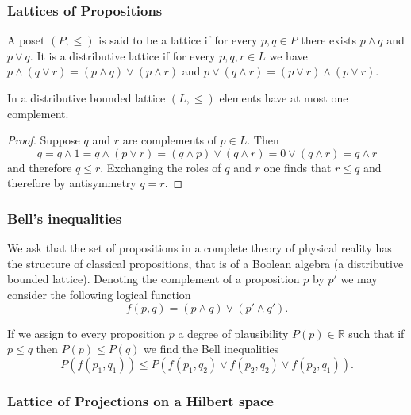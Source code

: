 \documentclass{beamer}
\theoremstyle{definition}
\begin{document}
\begin{frame}

\frametitle{Lattices of Propositions}

\begin{definition}
A poset $(P,\leq)$ is said to be a lattice if for every $p,q\in P$ there exists $p\wedge q$ and $p\vee q$. It is a distributive lattice if for every $p,q,r\in L$ we have $p\wedge (q\vee r)=(p\wedge q)\vee (p\wedge r)$ and $p\vee (q\wedge r)=(p\vee r)\wedge (p\vee r)$.
\end{definition}

\begin{theorem}
In a distributive bounded lattice $(L,\leq)$ elements have at most one complement.
\end{theorem}

\begin{proof}
Suppose $q$ and $r$ are complements of $p\in L$. Then
\begin{equation}
q = q\wedge 1 = q\wedge (p\vee r) =(q\wedge p)\vee(q\wedge r) = 0\vee(q\wedge r)=q\wedge r 
\end{equation}
and therefore $q\leq r$. Exchanging the roles of $q$ and $r$ one finds that $r\leq q$ and therefore by antisymmetry $q=r$.
\end{proof}

\end{frame}

\begin{frame}

\frametitle{Bell's inequalities}

We ask that the set of propositions in a complete theory of physical reality has the structure of classical propositions, that is of a Boolean algebra (a distributive bounded lattice). Denoting the complement of a proposition $p$ by $p'$ we may consider the following logical function
\begin{equation}
f(p,q)=(p\wedge q)\vee (p' \wedge q').
\end{equation}

If we assign to every proposition $p$ a degree of plausibility $P(p)\in\mathbb{R}$ such that if $p\leq q$ then $P(p)\leq P(q)$ we find the Bell inequalities
\begin{equation}
P(f(p_1,q_1))\leq P(f(p_1,q_2)\vee f(p_2,q_2)\vee f(p_2,q_1)).
\end{equation}

\end{frame}

\begin{frame}

\frametitle{Lattice of Projections on a Hilbert space}

\end{frame}
\end{document}
